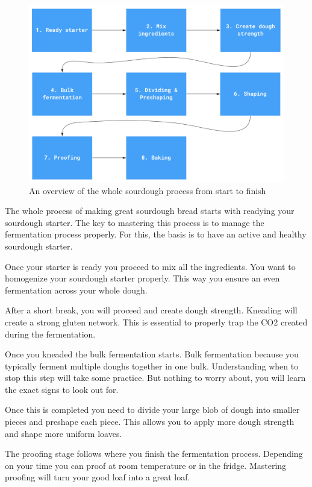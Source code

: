 \begin{figure}[!htb]
  \includegraphics[width=\textwidth]{sourdough-process-overview.jpg}
  \caption{An overview of the whole sourdough process from start to finish}
\end{figure}

The whole process of making great sourdough bread starts with
readying your sourdough starter. The key to mastering
this process is to manage the fermentation process properly.
For this, the basis is to have an active and healthy
sourdough starter.

Once your starter is ready you proceed to mix all the ingredients.
You want to homogenize your sourdough starter properly. This
way you ensure an even fermentation across your whole dough.

After a short break, you will proceed and create dough strength.
Kneading will create a strong gluten network. This is essential
to properly trap the CO2 created during the fermentation.

Once you kneaded the bulk fermentation starts. Bulk fermentation
because you typically ferment multiple doughs together in one bulk.
Understanding when to stop this step will take some practice.
But nothing to worry about, you will learn the exact signs to look out for.

Once this is completed you need to divide your large blob of
dough into smaller pieces and preshape each piece. This allows
you to apply more dough strength and shape more uniform loaves.

The proofing stage follows where you finish the fermentation process.
Depending on your time you can proof at room temperature or in the fridge.
Mastering proofing will turn your good loaf into a great loaf.

